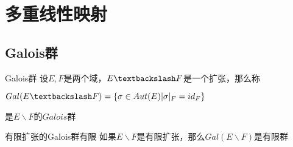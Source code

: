 \documentclass[12pt, a4paper, oneside, UTF8]{ctexbook}
\begin{document}
% 
\else
\fi
\chapter{多重线性映射}
	\section{Galois群}
		\begin{defn}{Galois群}{}
			设$E,F$是两个域，$E \textbackslash F$是一个扩张，那么称
			
			$Gal(E\textbackslash F) = \{\sigma \in Aut(E) | \sigma |_{F} = id_F\}$
			
			是$E \backslash F$的$Galois$群
		\end{defn}
		\begin{them}{有限扩张的Galois群有限}{}
			如果$E\backslash F$是有限扩张，那么$Gal(E\backslash F)$是有限群
		\end{them}
\ifx\allfiles\undefined
\end{document}
